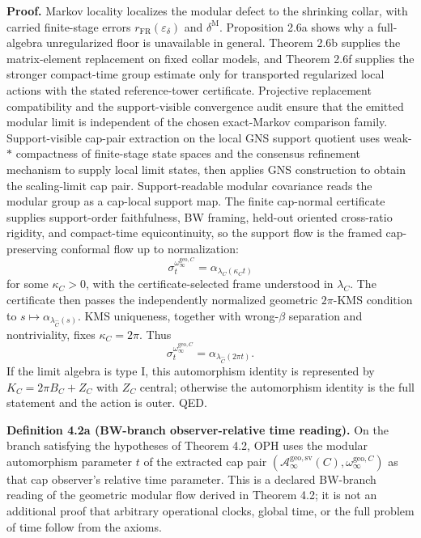 \textbf{Proof.} Markov locality localizes the modular defect to the shrinking collar, with carried finite-stage errors \(r_{\mathrm{FR}}(\varepsilon_\delta)\) and \(\delta^{\mathrm M}\). Proposition 2.6a shows why a full-algebra unregularized floor is unavailable in general. Theorem 2.6b supplies the matrix-element replacement on fixed collar models, and Theorem 2.6f supplies the stronger compact-time group estimate only for transported regularized local actions with the stated reference-tower certificate. Projective replacement compatibility and the support-visible convergence audit ensure that the emitted modular limit is independent of the chosen exact-Markov comparison family. Support-visible cap-pair extraction on the local GNS support quotient uses weak-\(*\) compactness of finite-stage state spaces and the consensus refinement mechanism to supply local limit states, then applies GNS construction to obtain the scaling-limit cap pair. Support-readable modular covariance reads the modular group as a cap-local support map. The finite cap-normal certificate supplies support-order faithfulness, BW framing, held-out oriented cross-ratio rigidity, and compact-time equicontinuity, so the support flow is the framed cap-preserving conformal flow up to normalization:
\[
\sigma_t^{\omega_\infty^{\mathrm{geo},C}}
=
\alpha_{\lambda_C(\kappa_C t)}
\]
for some \(\kappa_C>0\), with the certificate-selected frame understood in \(\lambda_C\). The
certificate then passes the independently normalized geometric \(2\pi\)-KMS condition to
\(s\mapsto\alpha_{\lambda_{\widehat C}(s)}\). KMS uniqueness, together with wrong-\(\beta\)
separation and nontriviality, fixes \(\kappa_C=2\pi\). Thus
\[
\sigma_t^{\omega_\infty^{\mathrm{geo},C}}
=
\alpha_{\lambda_{\widehat C}(2\pi t)}.
\]
If the limit algebra is type I, this automorphism identity is represented by
\(K_C=2\pi B_C+Z_C\) with \(Z_C\) central; otherwise the automorphism identity is the full
statement and the action is outer. QED.

\textbf{Definition 4.2a (BW-branch observer-relative time reading).}
On the branch satisfying the hypotheses of Theorem 4.2, OPH uses the modular automorphism
parameter \(t\) of the extracted cap pair
\((\mathcal A_\infty^{\mathrm{geo,sv}}(C),\omega_\infty^{\mathrm{geo},C})\) as that cap
observer's relative time parameter. This is a declared BW-branch reading of the geometric
modular flow derived in Theorem 4.2; it is not an additional proof that arbitrary operational
clocks, global time, or the full problem of time follow from the axioms.

